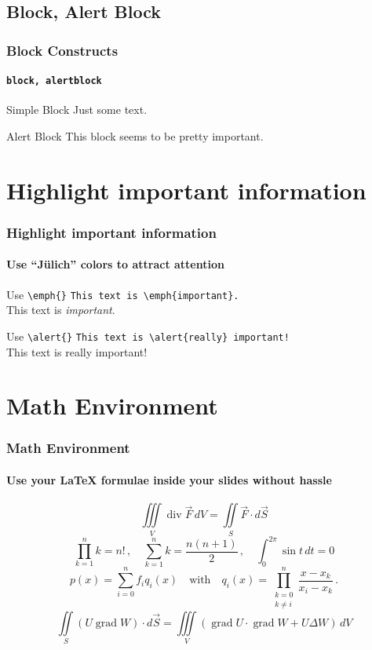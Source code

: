 \subsection{Block, Alert Block}
\begin{frame}
        \frametitle{Block Constructs}
        \framesubtitle{{\tt block, alertblock}}
        \begin{block}{Simple Block}
                Just some text.
        \end{block}
        \begin{alertblock}{Alert Block}
                This block seems to be pretty important.
        \end{alertblock}
\end{frame}

\section{Highlight important information}
\begin{frame}[fragile]
        \frametitle{Highlight important information}
        \framesubtitle{Use ``Jülich'' colors to attract attention}
        \begin{block}{Use {\tt \textbackslash{}emph\{\}}}
                \verb+This text is \emph{important}.+ \\
                This text is \emph{important}.
        \end{block}
        \begin{block}{Use {\tt \textbackslash{}alert\{\}}}
                \verb+This text is \alert{really} important!+ \\
                This text is \alert{really} important!
        \end{block}
\end{frame}

\section{Math Environment}
\begin{frame}
        \frametitle{Math Environment}
        \framesubtitle{Use your {\LaTeX} formulae inside your slides without hassle}
        \[
            \iiint\limits_V \operatorname{div} \vec{F} \, dV
            = \iint\limits_S \vec{F}\cdot d\vec{S}
        \]
        \[
         \prod_{k=1}^n k = n! \,,\quad \sum_{k=1}^n k=\frac{n(n+1)}{2}\,,
          \quad \int_0^{2\pi}\sin t\,dt=0
        \]
        \[
            p(x)=\sum_{i=0}^n f_{i}q_{i}(x) \quad\mbox{with}\quad
            q_{i}(x)=\prod_{\substack{k=0 \\ k\neq i}}^n
            \frac{x-x_{k}}{x_{i}-x_{k}}\,.
        \]
        \[
            \iint\limits_S (U \operatorname{grad} W)\cdot d\vec{S}
            =\iiint\limits_V (\operatorname{grad} U\cdot
             \operatorname{grad} W +U\Delta W)\,dV
        \]
\end{frame}


